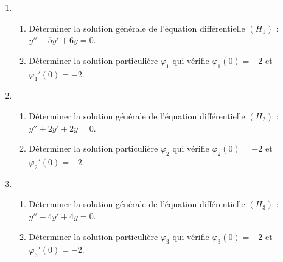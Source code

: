 
\begin{exercice}\label{exoautoanalyseCTU-36}

 

\begin{enumerate}
\item \begin{enumerate}
\item  Déterminer la solution générale de  l'équation différentielle $(H_{1})$ : $y''-5y'+6y=0$.
\item Déterminer la solution particulière $\varphi_{1}$ qui vérifie  $\varphi_{1}(0)=-2$ et  $\varphi_{1}'(0)=-2$.
\end{enumerate}
\item \begin{enumerate}
\item  Déterminer la solution générale de  l'équation différentielle $(H_{2})$  : $y''+2y'+2y=0$.
\item Déterminer la solution particulière $\varphi_{2}$ qui vérifie  $\varphi_{2}(0)=-2$ et  $\varphi_{2}'(0)=-2$.
\end{enumerate}
\item \begin{enumerate}
\item  Déterminer la solution générale de  l'équation différentielle $(H_{3})$  : $y''-4y'+4y=0$.
\item Déterminer la solution particulière $\varphi_{3}$ qui vérifie  $\varphi_{3}(0)=-2$ et  $\varphi_{3}'(0)=-2$.
\end{enumerate}

\end{enumerate}

\end{exercice}
